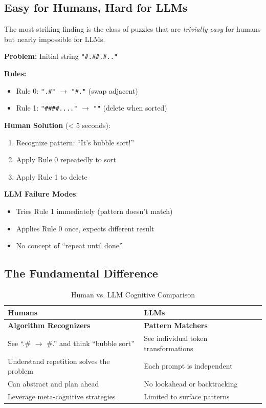 \documentclass[11pt,a4paper]{article}
\begin{document}
\subsection{Easy for Humans, Hard for LLMs}

The most striking finding is the class of puzzles that are \textit{trivially easy} for humans but nearly impossible for LLMs.

\begin{tcolorbox}[colback=yellow!5,colframe=yellow!50!black,title=Case Study: Sorting Puzzles (8--24\% LLM Success)]
\textbf{Problem:} Initial string \texttt{"\#.\#\#.\#.."}

\textbf{Rules:}
\begin{itemize}
    \item Rule 0: \texttt{".\#"} $\rightarrow$ \texttt{"\#."} (swap adjacent)
    \item Rule 1: \texttt{"\#\#\#\#...."} $\rightarrow$ \texttt{""} (delete when sorted)
\end{itemize}

\textbf{Human Solution} (< 5 seconds):
\begin{enumerate}
    \item Recognize pattern: ``It's bubble sort!''
    \item Apply Rule 0 repeatedly to sort
    \item Apply Rule 1 to delete
\end{enumerate}

\textbf{LLM Failure Modes}:
\begin{itemize}
    \item Tries Rule 1 immediately (pattern doesn't match)
    \item Applies Rule 0 once, expects different result
    \item No concept of ``repeat until done''
\end{itemize}
\end{tcolorbox}

\subsection{The Fundamental Difference}

\begin{table}[H]
\centering
\caption{Human vs. LLM Cognitive Comparison}
\begin{tabular}{p{6cm}p{6cm}}
\toprule
\textbf{Humans} & \textbf{LLMs} \\
\midrule
\textbf{Algorithm Recognizers} & \textbf{Pattern Matchers} \\
See ``.\# $\rightarrow$ \#.'' and think ``bubble sort'' & See individual token transformations \\
Understand repetition solves the problem & Each prompt is independent \\
Can abstract and plan ahead & No lookahead or backtracking \\
Leverage meta-cognitive strategies & Limited to surface patterns \\
\bottomrule
\end{tabular}
\end{table}
\end{document}
